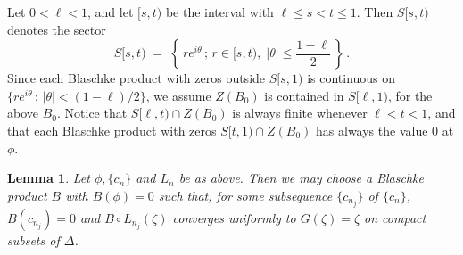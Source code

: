 \documentclass[12pt]{amsart}
\theoremstyle{plain}
\newtheorem{lem}{Lemma}[section]
\numberwithin{equation}{section}
\begin{document}
Let $0<\ell <1$, and let $[s,t)$ be the interval with
$\ell \le s < t \le 1$.
Then $S[s,t)$ denotes the sector
\begin{equation*}
S[s,t)\;=\;\left \{\, re^{i\theta} \, ; \, r \in [s,t),\;
\vert \theta\vert \le \frac{1-\ell}{2}\, \right \}\,.
\end{equation*}
Since each Blaschke product with zeros outside $S[s,1)$ is
continuous on $\{ re^{i\theta} \,; \,\vert \theta\vert < (1-\ell)/2\}$,
we assume $Z(B_0)$ is contained in $S[\ell,1)$, for the above $B_0$.
Notice that $S[\ell,t) \cap Z(B_0)$ is always finite whenever
$\ell < t < 1$, and that each Blaschke product with zeros
$S[t,1) \cap Z(B_0)$ has always the value $0$ at $\phi$.

\begin{lem}
\label{lem4.3}
Let $\phi, \{c_n\}$ and $L_n$ be as above. Then we may choose
a Blaschke product $B$ with $B(\phi) = 0$ such that,
for some subsequence $\{c_{n_j}\}$ of $\{c_n\}$, $B(c_{n_j}) = 0$
and $B\circ L _{n_j}(\zeta)$ converges uniformly to $G(\zeta)=\zeta$
on compact subsets of $\Delta$.
\end{lem}
\end{document}
